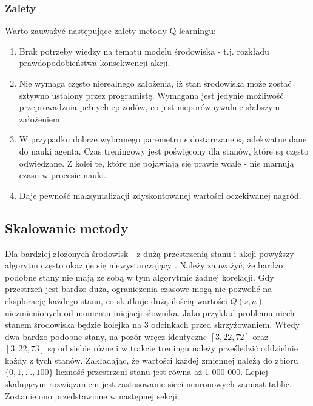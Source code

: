 \documentclass[12pt]{book}
\theoremstyle{plain}
\begin{document}
\subsubsection{Zalety} 
Warto zauważyć następujące zalety metody Q-learningu:
\begin{enumerate}
	\item Brak potrzeby wiedzy na tematu modelu środowiska - t.j. rozkładu prawdopodobieństwa konsekwencji akcji.
	\item Nie wymaga często nierealnego założenia, iż stan środowiska może zostać sztywno ustalony przez programistę. Wymagana jest jedynie możliwość przeprowadznia pełnych epizodów, co jest nieporównywalnie słabszym założeniem.
	\item W przypadku dobrze wybranego paremetru $\epsilon$ dostarczane są adekwatne dane do nauki agenta. Czas treningowy jest poświęcony dla stanów, które są często odwiedzane. Z kolei te, które nie pojawiają się prawie wcale - nie marnują czasu w procesie nauki.
	\item Daje pewność maksymalizacji zdyskontowanej wartości oczekiwanej nagród.
\end{enumerate}
\subsection*{Skalowanie metody}
Dla bardziej złożonych środowisk - z dużą przestrzenią stanu i akcji powyższy algorytm często okazuje się niewystarczający \cite{q_zlozony_env}. Należy zauważyć, że bardzo podobne stany nie mają ze sobą w tym algorytmie żadnej korelacji. Gdy przestrzeń jest bardzo duża, ograniczenia czasowe mogą nie pozwolić na eksplorację każdego stanu, co skutkuje dużą ilością wartości $Q(s,a)$ niezmienionych od momentu inicjacji słownika. Jako przykład problemu niech stanem środowiska będzie kolejka na 3 odcinkach przed skrzyżowaniem. Wtedy dwa bardzo podobne stany, na pozór wręcz identyczne $[3,22,72]$ oraz $[3,22,73]$ są od siebie różne i w trakcie treningu należy prześledzić oddzielnie każdy z tych stanów. Zakładając, że wartości każdej zmiennej należą do zbioru $\{0,1,...,100\}$ liczność przestrzeni stanu jest równa aż 1 000 000. Lepiej skalującym rozwiązaniem jest zastosowanie sieci neuronowych zamiast tablic. Zostanie ono przedstawione w następnej sekcji.
\end{document}
